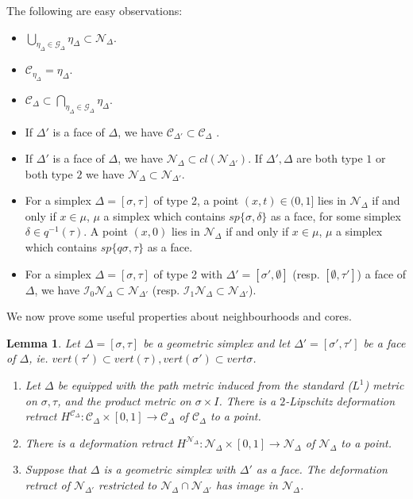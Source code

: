 \documentclass[a4paper,11pt]{article}
\theoremstyle{definition}
\theoremstyle{plain}
\newtheorem{lemma}[definition]{Lemma}
\theoremstyle{remark}
\begin{document}
The following are easy observations:

\begin{itemize}
\item$ \bigcup_{\eta_{\Delta}\in \mathcal{G}_{\Delta}} \eta_{\Delta} \subset \mathcal{N}_{\Delta}$.
\item$ \mathscr{C}_{\eta_{\Delta}} = \eta_{\Delta}$.
\item $\mathscr{C}_{\Delta} \subset \bigcap_{\eta_{\Delta}\in \mathcal{G}_{\Delta}} \eta_{\Delta}$.
\item If $\Delta'$ is a face of $\Delta$, we have $\mathscr{C}_{\Delta'}\subset \mathscr{C}_{\Delta}$ .
\item If $\Delta'$ is a face of $\Delta$, we have $\mathcal{N}_{\Delta}\subset cl(\mathcal{N}_{\Delta'})$. If $\Delta',\Delta$ are both type $1$ or both type $2$ we have $\mathcal{N}_{\Delta}\subset \mathcal{N}_{\Delta'}$.
\item For a simplex $\Delta = [\sigma,\tau]$ of type 2, a point $(x,t) \in (0,1]$ lies in $\mathcal{N}_{\Delta}$ if and only if $x\in \mu$, $\mu$ a simplex which contains $sp\{\sigma, \delta\}$ as a face, for some simplex $\delta \in q^{-1}(\tau)$. A point $(x,0)$ lies in $\mathcal{N}_{\Delta}$ if and only if $x\in \mu$, $\mu$ a simplex which contains $sp\{q\sigma, \tau\}$ as a face. 
\item For a simplex $\Delta = [\sigma,\tau]$ of type 2 with $\Delta' = [\sigma',\emptyset]$ (resp. $[\emptyset, \tau']$) a face of $\Delta$, we have $\mathcal{I}_{0} \mathcal{N}_{\Delta} \subset \mathcal{N}_{\Delta'}$ (resp. $\mathcal{I}_{1}\mathcal{N}_{\Delta} \subset \mathcal{N}_{\Delta'}$).
\end{itemize}
 We now prove some useful properties about neighbourhoods and cores. 

\begin{lemma} \label{usefulprops} Let $\Delta=[\sigma,\tau]$ be a geometric simplex and let $\Delta'=[\sigma',\tau']$ be a face of $\Delta$, ie. $vert(\tau') \subset vert(\tau), vert(\sigma')\subset vert \sigma$. 
\begin{enumerate}
\item Let $\Delta$ be equipped with the path metric induced from the standard ($L^1$) metric on $\sigma, \tau$, and the product metric on $\sigma \times I$. There is a $2$-Lipschitz deformation retract $H^{\mathscr{C}_{\Delta}}: \mathscr{C}_{\Delta} \times [0,1] \rightarrow \mathscr{C}_{\Delta}$ of $\mathscr{C}_{\Delta}$ to a point. 
\item There is a deformation retract $H^{\mathcal{N}_{\Delta}}: \mathcal{N}_{\Delta} \times [0,1]\rightarrow \mathcal{N}_{\Delta}$ of $\mathcal{N}_{\Delta}$ to a point. 
\item Suppose that $\Delta$ is a geometric simplex with $\Delta'$ as a face. The deformation retract of $\mathcal{N}_{\Delta'}$ restricted to $\mathcal{N}_{\Delta} \cap \mathcal{N}_{\Delta'}$ has image in $\mathcal{N}_{\Delta}$. 
\end{enumerate}
\end{lemma}
\end{document}
